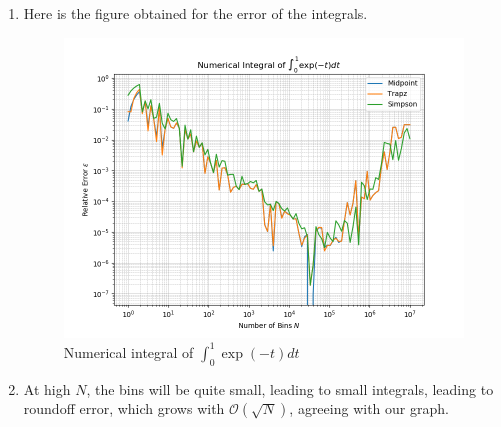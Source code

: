 \documentclass[11pt]{article}
\theoremstyle{theorem}
\theoremstyle{definition}
\theoremstyle{remark}
\begin{document}
\begin{enumerate}
\begin{enumerate}
\begin{lstlisting}[
language=Python,
basicstyle=\scriptsize,
breaklines=true]
def midpoint_rule(f: Callable[[np.single], np.single], a: np.single, b: np.single, N: np.single):
    n = int(N)
    h = (b - a) / N
    s = np.single(0)
    one = np.single(1)
    two = np.single(2)
    for k in range(n):
        s += f(a + (two*np.single(k) + one)*h/two)
    return h*s
    
def trapz_rule(f: Callable[[np.single], np.single], a: np.single, b: np.single, N: np.single):
    n = int(N)
    h = (b - a) / N
    s = np.single(0.5)*f(a) + np.single(0.5)*f(b)
    for k in range(1, n):
        s += f(a + np.single(k)*h)
    return h*s
    
def simpsons_rule(f: Callable[[np.single], np.single], a: np.single, b: np.single, N: np.single):
    n = int(N)
    h = (b - a) / N
    s = f(a) + f(b)
    two = np.single(2)
    four = np.single(4)
    for k in range(1,n,2):
        s += four*f(a + np.single(k)*h)
    for k in range(2,n,2):
        s += two*f(a + np.single(k)*h)
    return np.single(1/3)*h*s
\end{lstlisting}

    \item Here is the figure obtained for the error of the integrals.
    \begin{figure}[H]
        \centering
        \includegraphics[scale=0.65]{integral.png}
        \caption{Numerical integral of $\int_0^1\exp(-t)dt$}
        \label{fig:my_label}
    \end{figure}
    
    \item At high $N$, the bins will be quite small, leading to small integrals, leading to roundoff error, which grows with $\mathcal{O}(\sqrt{N})$, agreeing with our graph.


\end{enumerate}
\end{enumerate}
\end{document}
